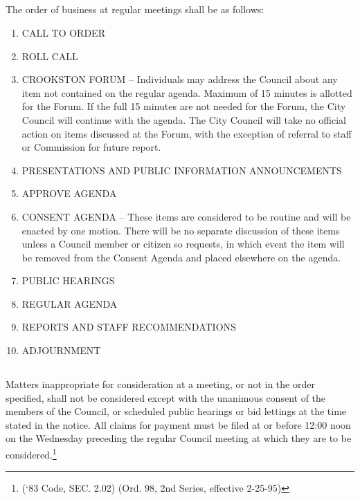 \subsection{}
The order of business at regular meetings shall be as follows:
\begin{enumerate}
    \item CALL TO ORDER
    \item ROLL CALL
    \item CROOKSTON FORUM -- Individuals may address the Council about any item not contained on the regular agenda.   Maximum of 15 minutes is allotted for the Forum.  If the full 15 minutes are not needed for the Forum, the City Council will continue with the agenda.  The City Council will take no official action on items discussed at the Forum, with the exception of referral to staff or Commission for future report.
    \item PRESENTATIONS AND PUBLIC INFORMATION ANNOUNCEMENTS
    \item APPROVE AGENDA
    \item CONSENT AGENDA -- These items are considered to be routine and will be enacted by one motion.  There will be no separate discussion of these items unless a Council member or citizen so requests, in which event the item will be removed from the Consent Agenda and placed elsewhere on the agenda.
    \item PUBLIC HEARINGS
    \item REGULAR AGENDA
    \item REPORTS AND STAFF RECOMMENDATIONS
    \item ADJOURNMENT
\end{enumerate}
\subsection{}
Matters inappropriate for consideration at a meeting, or not in the order specified, shall not be considered except with the unanimous consent of the members of the Council, or scheduled public hearings or bid lettings at the time stated in the notice.  All claims for payment must be filed at or before 12:00 noon on the Wednesday preceding the regular Council meeting at which they are to be considered.\footnote{(‘83 Code, SEC. 2.02)  (Ord. 98, 2nd Series, effective 2-25-95)}


